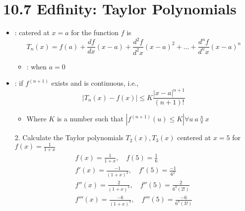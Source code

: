 \section{10.7 Edfinity: Taylor Polynomials}
\begin{itemize}
  \item {}: catered at  \(x=a\) for the function \(f\) is
    \[%
    T_n (x) = f (a) + \frac{df}{dx}(x-a)
    + \frac{d^2f}{d^2x}(x-a)^2
    + \ldots
    + \frac{d^nf}{d^nx}(x-a)^n
    \]%
  \begin{itemize}
    \item {}: when \(a = 0\)
  \end{itemize}

  \item {}: if \(f^{(n+1)} \) exists and is continuous, i.e.,
    \[%
    \left| T_n(x) - f(x) \right| \leq K \frac{|x-a|^{n+1} }{(n+1)!}
    \]%
    \begin{itemize}
      \item Where \(K\) is a number such that \(\left| f^{(n+1)}(u) \leq K
        \right| \forall u ~a\between x \)
    \end{itemize}

  \item[2.] Calculate the Taylor polynomials \(T_2 (x), T_3 (x)  \) centered at
    \(x = 5\) for \(f (x) = \displaystyle \frac{1}{1+x}\)
    \begin{align*}
     f(x) = \frac{1}{1+x}, \quad  f(5) = \frac{1}{6} \\
     f'(x) = \frac{-1}{(1+x)^2}, \quad  f'(5) = \frac{-1}{6^2} \\
     f''(x) = \frac{2}{(1+x)^3}, \quad  f''(5) = \frac{2}{6^3(2!)} \\
     f'''(x) = \frac{-6}{(1+x)^4}, \quad  f'''(5) = \frac{-6}{6^4(3!)} \\
    \end{align*}

\end{itemize}
